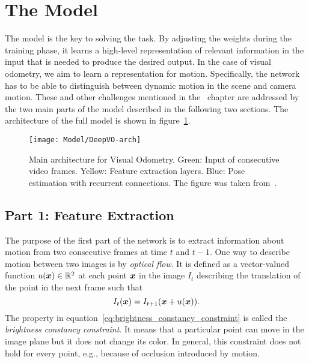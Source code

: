 	\section{The Model}
		The model is the key to solving the task.
		By adjusting the weights during the training phase, it learns a high-level representation of relevant information in the input that is needed to produce the desired output.
		In the case of visual odometry, we aim to learn a representation for motion.
		Specifically, the network has to be able to distinguish between dynamic motion in the scene and camera motion.
		These and other challenges mentioned in the~ chapter are addressed by the two main parts of the model described in the following two sections.
		The architecture of the full model is shown in figure~\ref{fig:main-architecture}.
		\begin{figure}[t]
			\centering
			\texttt{[image: Model/DeepVO-arch]}
			\caption[Main architecture for Visual Odometry]
					{Main architecture for Visual Odometry.
					 Green: Input of consecutive video frames.
					 Yellow: Feature extraction layers.
					 Blue: Pose estimation with recurrent connections.
					 The figure was taken from~\cite{wang2017deepvo}.
					 \label{fig:main-architecture}}
		\end{figure}
		
		\subsection{Part 1: Feature Extraction}
			The purpose of the first part of the network is to extract information about motion from two consecutive frames at time $t$ and $t - 1$.
			One way to describe motion between two images is by \emph{optical flow}.
			It is defined as a vector-valued function $u(\bm{x}) \in \mathbb{R}^2$ at each point $\bm{x}$ in the image $I_{t}$ describing the translation of the point in the next frame such that
			\begin{equation}\label{eq:brightness_constancy_constraint}
				I_{t}(\bm{x}) = I_{t + 1}(\bm{x} + u(\bm{x})).
			\end{equation}
			The property in equation~\ref{eq:brightness_constancy_constraint} is called the \emph{brightness constancy constraint}. 
			It means that a particular point can move in the image plane but it does not change its color.
			In general, this constraint does not hold for every point, e.g., because of occlusion introduced by motion.
			
